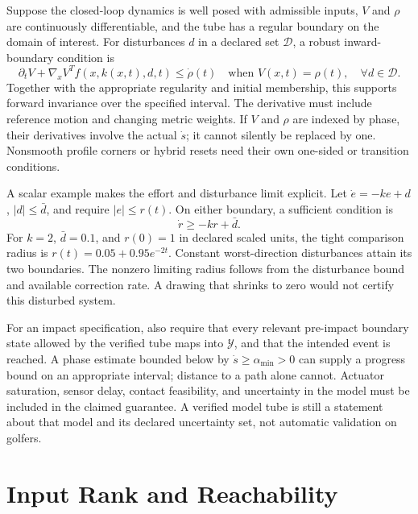 \documentclass[12pt, openany]{book}
\theoremstyle{plain}
\begin{document}
Suppose the closed-loop dynamics is well posed with admissible inputs,
$V$ and $\rho$ are continuously differentiable, and the tube has a regular
boundary on the domain of interest. For disturbances $d$ in a declared set
$\mathcal D$, a robust inward-boundary condition is
\begin{equation}
 \partial_t V+\nabla_x V^Tf(x,k(x,t),d,t)\leq\dot\rho(t)
 \quad\text{when }V(x,t)=\rho(t),\quad\forall d\in\mathcal D.
 \label{eq:motion_tube_boundary}
\end{equation}
Together with the appropriate regularity and initial membership, this supports
forward invariance over the specified interval. The derivative must include
reference motion and changing metric weights. If $V$ and $\rho$ are indexed
by phase, their derivatives involve the actual $\dot s$; it cannot silently
be replaced by one. Nonsmooth profile corners or hybrid resets need their own
one-sided or transition conditions.

A scalar example makes the effort and disturbance limit explicit. Let
$\dot e=-ke+d$, $|d|\leq\bar d$, and require $|e|\leq r(t)$. On either boundary,
a sufficient condition is
\begin{equation}
 \dot r\geq-kr+\bar d.
 \label{eq:motion_radius_condition}
\end{equation}
For $k=2$, $\bar d=0.1$, and $r(0)=1$ in declared scaled units, the tight
comparison radius is $r(t)=0.05+0.95e^{-2t}$. Constant worst-direction
disturbances attain its two boundaries. The nonzero limiting radius follows
from the disturbance bound and available correction rate. A drawing that
shrinks to zero would not certify this disturbed system.

For an impact specification, also require that every relevant pre-impact
boundary state allowed by the verified tube maps into $\mathcal Y$, and that
the intended event is reached. A phase estimate bounded below by
$\dot s\geq\alpha_{\min}>0$ can supply a progress bound on an appropriate
interval; distance to a path alone cannot. Actuator saturation, sensor delay,
contact feasibility, and uncertainty in the model must be included in the
claimed guarantee. A verified model tube is still a statement about that model
and its declared uncertainty set, not automatic validation on golfers.

\section{Input Rank and Reachability}
\end{document}
